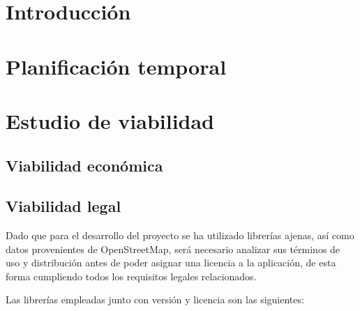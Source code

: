 
\section{Introducción}

\section{Planificación temporal}

\section{Estudio de viabilidad}

\subsection{Viabilidad económica}

\subsection{Viabilidad legal}

Dado que para el desarrollo del proyecto se ha utilizado librerías ajenas, así como datos provenientes de OpenStreetMap, será necesario analizar sus términos de uso y distribución antes de poder asignar una licencia a la aplicación, de esta forma cumpliendo todos los requisitos legales relacionados.

Las librerías empleadas junto con versión y licencia son las siguientes:


